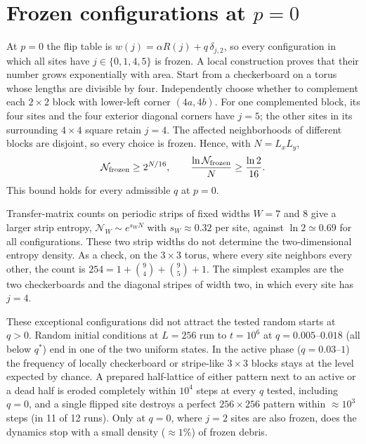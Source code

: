 \documentclass[pre,twocolumn,superscriptaddress,showpacs,floatfix]{revtex4-2}
\newcommand{\qs}{q^{*}}
\begin{document}
\appendix

\section{Frozen configurations at $p = 0$}
\label{app:frozen}

At $p = 0$ the flip table is $w(j) = \alpha R(j) + q\,\delta_{j,2}$, so every configuration in
which all sites have $j\in\{0,1,4,5\}$ is frozen. A local construction proves
that their number grows exponentially with area. Start from a checkerboard
on a torus whose lengths are divisible by four. Independently choose whether
to complement each $2\times2$ block with lower-left corner $(4a,4b)$.
For one complemented block, its four sites and the four exterior diagonal
corners have $j=5$; the other sites in its surrounding $4\times4$ square
retain $j=4$. The affected neighborhoods of different blocks are disjoint,
so every choice is frozen. Hence, with $N=L_xL_y$,
\begin{equation}
 \mathcal N_{\rm frozen}\ge 2^{N/16},\qquad
 \frac{\ln\mathcal N_{\rm frozen}}{N}\ge\frac{\ln2}{16}.
 \label{eq:frozenbound}
\end{equation}
This bound holds for every admissible $q$ at $p=0$.

Transfer-matrix counts on periodic strips of fixed widths $W=7$ and $8$
give a larger strip entropy, $\mathcal N_W\sim e^{s_WN}$ with
$s_W\approx0.32$ per site, against $\ln2\simeq0.69$ for all configurations.
These two strip widths do not determine the two-dimensional entropy density.
As a check,
on the $3\times3$ torus, where every site neighbors every other, the count is
$254 = 1 + \binom94 + \binom95 + 1$. The simplest examples are the two checkerboards and the
diagonal stripes of width two, in which every site has $j = 4$.

These exceptional configurations did not attract the tested random starts at $q>0$. Random initial conditions at $L = 256$
run to $t = 10^6$ at $q = 0.005$--$0.018$ (all below $\qs$) end in one of the two uniform states.
In the active phase ($q = 0.03$--$1$) the frequency of locally checkerboard or stripe-like
$3\times3$ blocks stays at the level expected by chance. A prepared half-lattice of either pattern
next to an active or a dead half is eroded completely within $10^4$ steps at every $q$ tested,
including $q = 0$, and a single flipped site destroys a perfect $256\times256$ pattern within
$\approx 10^3$ steps (in 11 of 12 runs). Only at $q = 0$, where $j = 2$ sites are also frozen, does
the dynamics stop with a small density ($\approx 1\%$) of frozen debris.
\end{document}
